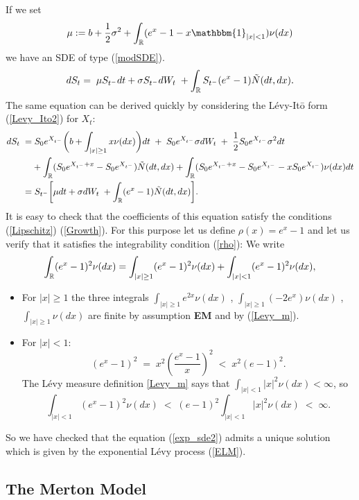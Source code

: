 If we set
\begin{equation}\label{mu}
 \mu := b + \frac{1}{2}\sigma^2 + \int_{\R} ( e^{x} - 1 -x\mathbbm{1}_{|x|<1}) \nu(dx)
\end{equation}
we have an SDE of type (\ref{modSDE}). 
\begin{equation}\label{exp_sde2}
 d S_t = \; \mu S_{t^-} dt +  \sigma S_{t^-} dW_t \; + \int_{\mathbb{R}} S_{t^-} (e^{x} - 1) \tilde N(dt,dx). 
\end{equation}
The same equation can be derived quickly by considering the Lévy-It\={o} form (\ref{Levy_Ito2}) for $X_t$:
\begin{align*}
 d S_t \; =& \; S_0 e^{X_{t^-}} \biggl( b + \int_{|x|\geq 1}x \nu(dx) \biggr) dt \; + \; S_0 e^{X_{t^-}} \sigma dW_t \; + \; \frac{1}{2}S_0 e^{X_{t^-}}\sigma^2 dt \\ \nonumber
          &+ \int_{\mathbb{R}} (S_0 e^{X_{t^-}+x} - S_0 e^{X_{t^-}}) \tilde N(dt,dx) + \int_{\mathbb{R}} (S_0 e^{X_{t^-}+x} - S_0 e^{X_{t^-}} - x S_0 e^{X_{t^-}}) \nu(dx) dt \\ \nonumber
          =& \; S_{t^-} \biggl[ \mu dt +  \sigma dW_t \; + \int_{\mathbb{R}} (e^{x} - 1) \tilde N(dt,dx) \biggr].\\
\end{align*}
It is easy to check that the coefficients of this equation satisfy the conditions (\ref{Lipschitz})
(\ref{Growth}). 
For this purpose let us define $\rho(x) = e^x-1$
and let us verify that it satisfies the integrability condition (\ref{rho}):
We write $$ \int_{\mathbb{R}} (e^x-1)^2 \nu(dx) = \int_{|x|\geq1} (e^x-1)^2 \nu(dx) + \int_{|x| < 1} (e^x-1)^2 \nu(dx),$$
 \begin{itemize}
  \item For $|x|\geq 1$ the three integrals $\int_{|x|\geq1} e^{2x} \nu(dx)$ , $\int_{|x|\geq1} (-2e^x) \nu(dx)$ ,
  $\int_{|x|\geq1} \nu(dx)$ are finite by assumption \textbf{EM} and by (\ref{Levy_m}).
  \item For $|x| < 1$: 
  $$(e^x-1)^2 \; = \; x^2 \left(\frac{e^x-1}{x}\right)^2 \; < \; x^2 (e-1)^2. $$ 
The Lévy measure definition \ref{Levy_m} says that $ \int_{|x|<1} |x|^2 \nu(dx) < \infty $, so
$$ \int_{|x|<1} (e^x-1)^2 \nu(dx) \; < \; (e-1)^2 \int_{|x|<1} |x|^2 \nu(dx) \; < \; \infty. $$  
 \end{itemize}
So we have checked that the equation (\ref{exp_sde2}) admits a unique solution which is given by the exponential 
Lévy process (\ref{ELM}).

\subsection{The Merton Model}\label{Merton_section}

